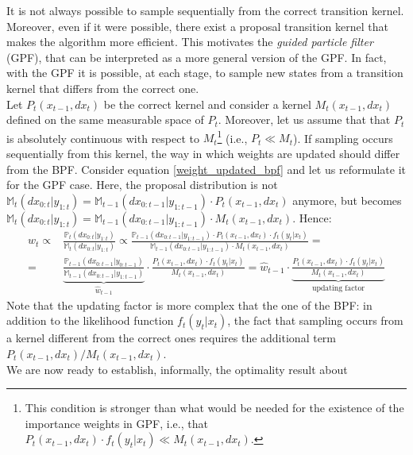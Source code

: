 \documentclass[
]{book}
\theoremstyle{break}
\theoremstyle{nonumberplain}
\begin{document}
It is not always possible to sample sequentially from the correct
transition kernel. Moreover, even if it were possible, there exist a
proposal transition kernel that makes the algorithm more efficient. This
motivates the \textit{guided particle filter} (GPF), that can be
interpreted as a more general version of the GPF. In fact, with the GPF
it is possible, at each stage, to sample new states from a transition
kernel that differs from the correct one.~\\
Let \(P_t(x_{t-1},dx_t)\) be the correct kernel and consider a kernel
\(M_t(x_{t-1},dx_t)\) defined on the same measurable space of \(P_t\).
Moreover, let us assume that that \(P_t\) is absolutely continuous with
respect to
\(M_t\)\footnote{This condition is stronger than what would be needed for the existence of the importance weights in GPF, i.e., that  $P_t(x_{t-1},dx_t)\cdot f_t(y_t|x_t)\ll M_t(x_{t-1},dx_t)$. }
(i.e., \(P_t\ll M_t\)). If sampling occurs sequentially from this
kernel, the way in which weights are updated should differ from the BPF.
Consider equation \eqref{weight_updated_bpf} and let us reformulate it
for the GPF case. Here, the proposal distribution is not
\(\mathbb M_t(dx_{0:t}|y_{1:t})=\mathbb M_{t-1}(dx_{0:t-1}|y_{1:t-1})\cdot P_t(x_{t-1},dx_t)\)
anymore, but becomes
\(\mathbb M_t(dx_{0:t}|y_{1:t})=\mathbb M_{t-1}(dx_{0:t-1}|y_{1:t-1})\cdot M_t(x_{t-1},dx_t)\).
Hence: \begin{equation}
    \begin{split}
        w_t\propto&\frac{\mathbb P_t(dx_{0:t}|y_{1:t})}{\mathbb M_t(dx_{0:t}|y_{1:t})}\propto \frac{\mathbb P_{t-1}(dx_{0:t-1}|y_{1:t-1})\cdot P_t(x_{t-1},dx_t)\cdot f_t(y_t|x_t)}{\mathbb M_{t-1}(dx_{0:t-1}|y_{1:t-1})\cdot M_t(x_{t-1},dx_t)}=\\
        =&\underbrace{\frac{\mathbb P_{t-1}(dx_{0:t-1}|y_{0:t-1})}{\mathbb M_{t-1}(dx_{0:t-1}|y_{1:t-1})}}_{\hat w_{t-1}}\cdot\frac{P_t(x_{t-1},dx_t)\cdot f_t(y_t|x_t)}{ M_t(x_{t-1},dx_t)} =\hat w_{t-1}\cdot\underbrace{\frac{P_t(x_{t-1},dx_t)\cdot f_t(y_t|x_t)}{ M_t(x_{t-1},dx_t)}}_{\text{updating factor}}
    \end{split}\label{weight_updated_gpf}
\end{equation} Note that the updating factor is more complex that the
one of the BPF: in addition to the likelihood function \(f_t(y_t|x_t)\),
the fact that sampling occurs from a kernel different from the correct
ones requires the additional term
\(P_t(x_{t-1},dx_t)/M_t(x_{t-1},dx_t)\).~\\
We are now ready to establish, informally, the optimality result about
\end{document}
